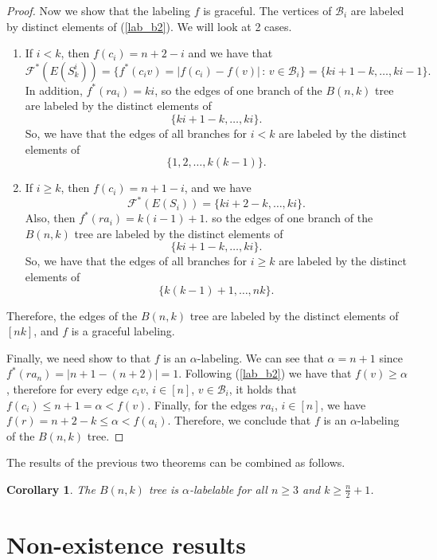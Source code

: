 \documentclass[10pt]{article}
\newtheorem{corollary}{Corollary}[theorem]
\theoremstyle{definition}
\begin{document}
\begin{proof}
  Now we show that the labeling $f$ is graceful. The vertices of $\mathcal{B}_i$ are labeled by distinct elements of (\ref{lab_b2}). We will look at 2 cases.
  \begin{enumerate}
    \item If $i < k$, then  $f(c_i) = n + 2 - i$ and we have that
      $$
      \mathcal{F}^*(E(S_k^i)) = \{ f^*(c_i v) = |f(c_i) - f(v)| \, : \, v \in \mathcal{B}_i \}
      = \{ki + 1 - k , \ldots, k i - 1\}.
      $$
      In addition, $f^*(r a_i) = k i$, so the edges of one branch of the $B(n,k)$ tree are labeled by the distinct elements of
      $$
      \{ki + 1 - k , \ldots, k i\}.
      $$
      So, we have that the edges of all branches for $i < k$ are labeled by the distinct elements of
      $$
      \{1, 2, \dots, k(k - 1)\}.
      $$
    \item If $i \geq k$, then $f(c_i) = n + 1 - i$, and we have
      $$
      \mathcal{F}^*(E(S_i)) = \{ki + 2 - k , \ldots, k i\}.
      $$
      Also, then  $f^*(r a_i) = k (i - 1) + 1$. so the edges of one branch of the $B(n,k)$ tree are labeled by the distinct elements of
      $$
      \{ki + 1 - k , \ldots, k i\}.
      $$
      So, we have that the edges of all branches for $i \geq k$ are labeled by the distinct elements of
      $$
      \{k (k - 1) + 1, \ldots, nk\}.
      $$
  \end{enumerate}
  Therefore, the edges of the $B(n,k)$ tree are labeled by the distinct elements of $[nk]$, and $f$ is a graceful labeling.

  Finally, we need show to that $f$ is an $\alpha$-labeling.  We can see that $\alpha = n + 1$ since $f^*(ra_n) = |n + 1 - (n + 2)| = 1$. Following (\ref{lab_b2}) we have that $f(v) \ge \alpha$, therefore for every edge $c_i v$, $i \in [n]$, $v \in \mathcal{B}_i$, it holds that $f(c_i) \le n + 1 = \alpha < f(v)$. Finally, for the edges $r a_i$, $i \in [n]$, we have $f(r) = n + 2-k \leq \alpha < f(a_i)$. Therefore, we conclude that $f$ is an $\alpha$-labeling of the $B(n, k)$ tree.
\end{proof}

The results of the previous two theorems can be combined as follows.
\begin{corollary}
  The $B(n, k)$ tree is $\alpha$-labelable for all $n \geq 3$ and $k \geq \frac{n}{2} + 1$.
\end{corollary}

\section{Non-existence results}
\end{document}
